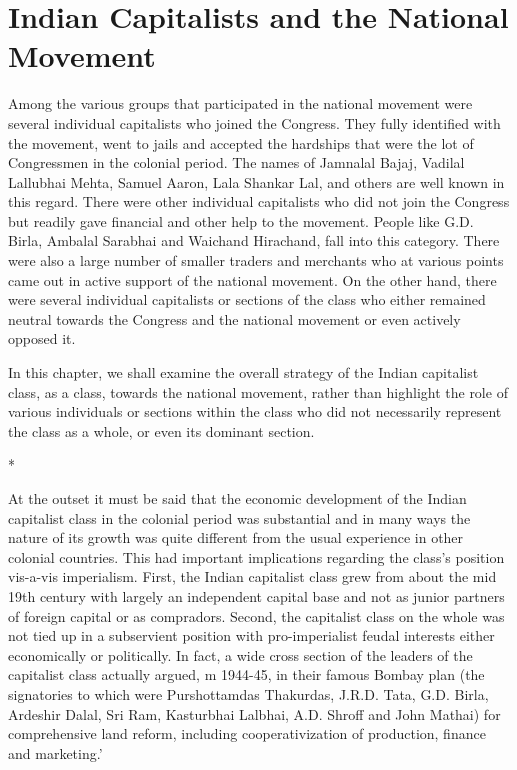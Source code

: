 \chapter{Indian Capitalists and the National Movement}



Among the various groups that participated in the national movement were several individual capitalists who joined the Congress. They fully identified with the movement, went to jails and accepted the hardships that were the lot of Congressmen in the colonial period. The names of Jamnalal Bajaj, Vadilal Lallubhai Mehta, Samuel Aaron, Lala Shankar Lal, and others are well known in this regard. There were other individual capitalists who did not join the Congress but readily gave financial and other help to the movement. People like G.D. Birla, Ambalal Sarabhai and Waichand Hirachand, fall into this category. There were also a large number of smaller traders and merchants who at various points came out in active support of the national movement. On the other hand, there were several individual capitalists or sections of the class who either remained neutral towards the Congress and the national movement or even actively opposed it. 

In this chapter, we shall examine the overall strategy of the Indian capitalist class, as a class, towards the national movement, rather than highlight the role of various individuals or sections within the class who did not necessarily represent the class as a whole, or even its dominant section.

\begin{center}*\end{center}



At the outset it must be said that the economic development of the Indian capitalist class in the colonial period was substantial and in many ways the nature of its growth was quite different from the usual experience in other colonial countries. This had important implications regarding the class’s position vis-a-vis imperialism. First, the Indian capitalist class grew from about the mid 19th century with largely an independent capital base and not as junior partners of foreign capital or as compradors. Second, the capitalist class on the whole was not tied up in a subservient position with pro-imperialist feudal interests either economically or politically. In fact, a wide cross section of the leaders of the capitalist class actually argued, m 1944-45, in their famous Bombay plan (the signatories to which were Purshottamdas Thakurdas, J.R.D. Tata, G.D. Birla, Ardeshir Dalal, Sri Ram, Kasturbhai Lalbhai, A.D. Shroff and John Mathai) for comprehensive land reform, including cooperativization of production, finance and marketing.’ 

